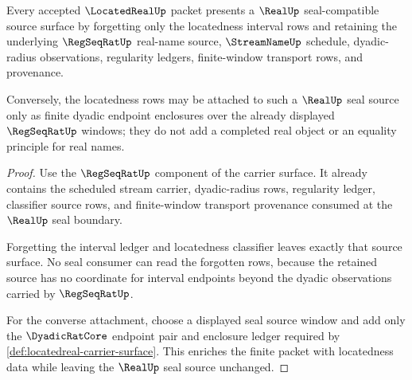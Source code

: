 \begin{theorem}
\label{thm:locatedreal-realup-seal-compatibility}
Every accepted $\LocatedRealUp$ packet presents a $\RealUp$ seal-compatible source surface by forgetting only the locatedness interval rows and retaining the underlying $\RegSeqRatUp$ real-name source, $\StreamNameUp$ schedule, dyadic-radius observations, regularity ledgers, finite-window transport rows, and provenance.

Conversely, the locatedness rows may be attached to such a $\RealUp$ seal source only as finite dyadic endpoint enclosures over the already displayed $\RegSeqRatUp$ windows; they do not add a completed real object or an equality principle for real names.
\end{theorem}
\begin{proof}
Use the $\RegSeqRatUp$ component of the carrier surface. It already contains the scheduled stream carrier, dyadic-radius rows, regularity ledger, classifier source rows, and finite-window transport provenance consumed at the $\RealUp$ seal boundary.

Forgetting the interval ledger and locatedness classifier leaves exactly that source surface. No seal consumer can read the forgotten rows, because the retained source has no coordinate for interval endpoints beyond the dyadic observations carried by $\RegSeqRatUp$.

For the converse attachment, choose a displayed seal source window and add only the $\DyadicRatCore$ endpoint pair and enclosure ledger required by \autoref{def:locatedreal-carrier-surface}. This enriches the finite packet with locatedness data while leaving the $\RealUp$ seal source unchanged.
\end{proof}

